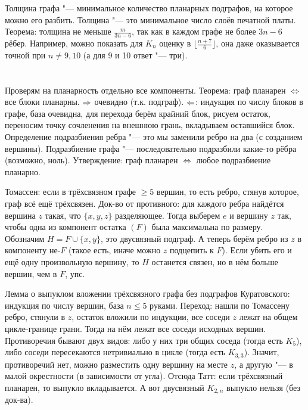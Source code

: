 	Толщина графа "--- минимальное количество планарных подграфов, на которое можно его разбить.
	Толщина "--- это минимальное число слоёв печатной платы.
	Теорема: толщина не меньше $\frac{m}{3n-6}$, так как в каждом графе не более $3n-6$ рёбер.
	Например, можно показать для $K_n$ оценку в $\lfloor\frac{n+7}{6}\rfloor$, она даже оказывается точной при $n \neq 9,10$
	(а для 9 и 10 ответ "--- три).

\section{} %
	Проверям на планарность отдельно все компоненты.
	Теорема: граф планарен $\iff$ все блоки планарны.
	$\Rightarrow$ очевидно (т.к. подграф).
	$\Leftarrow$: индукция по числу блоков в графе, база очевидна, для перехода берём крайний блок, рисуем остаток, переносим точку сочленения на внешнюю грань, вкладываем оставшийся блок.
	Определение подразбиения ребра "--- это мы заменили ребро на два (с созданием вершины).
	Подразбиение графа "--- последовательно подразбили какие-то рёбра (возможно, ноль).
	Утверждение: граф планарен $\iff$ любое подразбиение планарно.

	Томассен: если в трёхсвязном графе $\ge 5$ вершин, то есть ребро, стянув которое, граф всё ещё трёхсвязен.
	Док-во от противного: для каждого ребра найдётся вершина $z$ такая, что $\{x,y,z\}$ разделяющее.
	Тогда выберем $e$ и вершину $z$ так, чтобы одна из компонент остатка $(F)$ была максимальна по размеру.
	Обозначим $H=F\cup\{x, y\}$, это двусвязный подграф.
	А теперь берём ребро из $z$ в компоненту не-$F$ (такое есть, иначе можно $z$ подцепить к $F$).
	Если убить его и ещё одну произвольную вершину, то $H$ останется связен, но в нём больше вершин, чем в $F$, упс.

	Лемма о выпуклом вложении трёхсвязного графа без подграфов Куратовского: индукция по числу вершин, база $n \le 5$ руками.
	Переход: нашли по Томассену ребро, стянули в $z$, остаток вложили по индукции, все соседи $z$ лежат на общем цикле-границе грани.
	Тогда на нём лежат все соседи исходных вершин.
	Противоречия бывают двух видов: либо у них три общих соседа (тогда есть $K_5$), либо соседи пересекаются нетривиально в цикле (тогда есть $K_{3,3}$).
	Значит, противоречий нет, можно разместить одну вершину на месте $z$, а другую "--- в малой окрестности (в зависимости от угла).
	Отсюда Татт: если трёхсвязный планарен, то выпукло вкладывается.
	А вот двусвязный $K_{2,n}$ выпукло нельзя (без док-ва).

